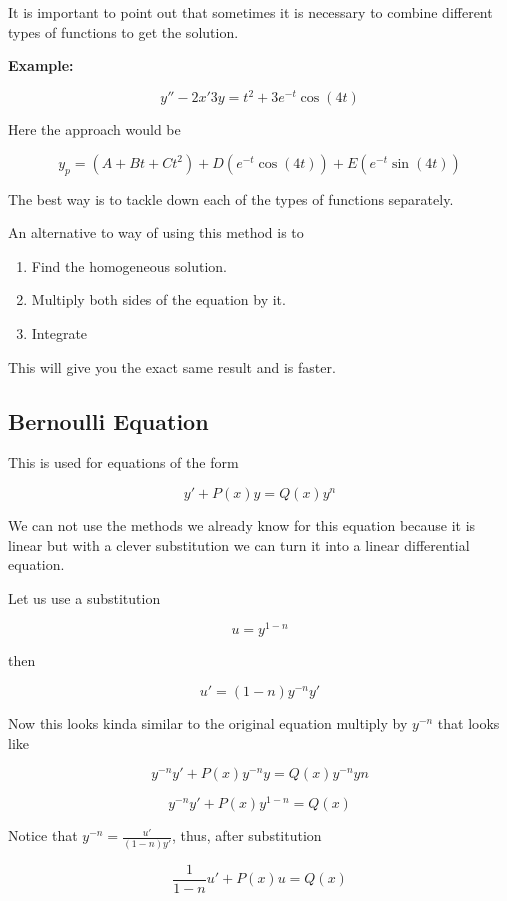 It is important to point out that sometimes it is necessary to combine different types
of functions to get the solution.
\vspace{\baselineskip}

\textbf{Example:}

\[
y'' -2x' 3y = t^2  + 3e^{-t} \cos (4t)
\]

Here the approach would be

\[
y_p = (A + Bt + Ct^2) + D(e^{-t}\cos(4t)) + E(e^{-t}\sin(4t))
\]

The best way is to tackle down each of the types of functions separately.
\vspace{\baselineskip}

An alternative to way of using this method is to
\begin{enumerate}
    \item Find the homogeneous solution.
    \item Multiply both sides of the equation by it.
    \item Integrate
\end{enumerate}

This will give you the exact same result and is faster.

\subsection{Bernoulli Equation}

This is used for equations of the form 

\[
y' + P(x)y = Q(x)y^n
\]

We can not use the methods we already know for this equation because it is linear but with a
clever substitution we can turn it into a linear differential equation.
\vspace{\baselineskip}

Let us use a substitution 

\[u = y^{1 - n}\] 

then 

\[u' = (1 - n)y^{-n} y'\] 

Now this 
looks kinda similar to the original equation multiply by \(y^{-n}\) that looks like

\[
y^{-n}y' + P(x)y^{-n}y = Q(x)y^{-n}y{n}
\]

\[
y^{-n}y' + P(x)y^{1 - n} = Q(x)
\]


Notice that \(y^{-n} = \frac{u'}{(1-n)y'}\), thus, after substitution

\[
\frac{1}{1 - n}u' + P(x)u = Q(x)
\]

